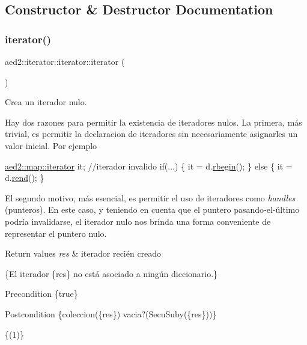 \subsection{Constructor \& Destructor Documentation}
\mbox{\label{classaed2_1_1iterator_1_1iterator_ae488782067dfba96b447080b0db1ed2c}} 
\subsubsection{\texorpdfstring{iterator()}{iterator()}}
{\footnotesize\ttfamily aed2\+::iterator\+::iterator\+::iterator (\begin{DoxyParamCaption}{ }\end{DoxyParamCaption})\hspace{0.3cm}{\ttfamily [inline]}}



Crea un iterador nulo. 

Hay dos razones para permitir la existencia de iteradores nulos. La primera, más trivial, es permitir la declaracion de iteradores sin necesariamente asignarles un valor inicial. Por ejemplo 
\begin{DoxyCode}
\hyperlink{classaed2_1_1map_1_1iterator}{aed2::map::iterator} it;   \textcolor{comment}{//iterador invalido}
\textcolor{keywordflow}{if}(...) \{
  it = d.\hyperlink{classaed2_1_1map_ac412d3902112122c1bffe2d4283a4e9d}{rbegin}();
\} \textcolor{keywordflow}{else} \{
  it = d.\hyperlink{classaed2_1_1map_a277f03b4f4b6b98879e4e4921081801f}{rend}();
\}
\end{DoxyCode}
 El segundo motivo, más esencial, es permitir el uso de iteradores como {\itshape handles} (punteros). En este caso, y teniendo en cuenta que el puntero pasando-\/el-\/último podría invalidarse, el iterador nulo nos brinda una forma conveniente de representar el puntero nulo.


\begin{DoxyRetVals}{Return values}
{\em res} & iterador recién creado\\
\hline
\end{DoxyRetVals}
\{El iterador \{res\} no está asociado a ningún diccionario.\}

\begin{DoxyPrecond}{Precondition}
\{true\} 
\end{DoxyPrecond}
\begin{DoxyPostcond}{Postcondition}
\{coleccion(\{res\})    vacia?(Secu\+Suby(\{res\}))\}
\end{DoxyPostcond}
\{(1)\}

